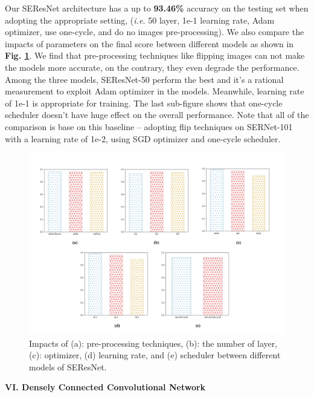 \documentclass[a4paper]{article}
\begin{document}
\large{
Our \textsf{SEResNet} architecture has a up to \textbf{93.46\%} accuracy on the testing set when adopting the appropriate setting, (\textit{i.e.} 50 layer, 1e-1 learning rate, Adam optimizer, use one-cycle, and do no images pre-processing). We also compare the impacts of parameters on the final score between different models as shown in \textbf{Fig. \ref{serescompare}}. We find that pre-processing techniques like flipping images can not make the models more accurate, on the contrary, they even degrade the performance. Among the three models, \textsf{SEResNet-50} perform the best and it's a rational measurement to exploit Adam optimizer in the models. Meanwhile, learning rate of 1e-1 is appropriate for training. The last sub-figure shows that one-cycle scheduler doesn't have huge effect on the overall performance. Note that all of the comparison is base on this baseline -- adopting flip techniques on \textsf{SERNet-101} with a learning rate of 1e-2, using SGD optimizer and one-cycle scheduler.

\begin{figure}[h]
\centering
\includegraphics[width=15cm]{se-res.pdf}
\caption{ Impacts of (a): pre-processing techniques, (b): the number of layer, (c): optimizer, (d) learning rate, and (e) scheduler between different models of \textsf{SEResNet}.}
\label{serescompare}
\end{figure}

}

\clearpage
\vspace{5mm}
\begin{center}
\LARGE\textbf{VI. Densely Connected Convolutional Network} \\
\end{center}
\vspace{2mm}
\end{document}
